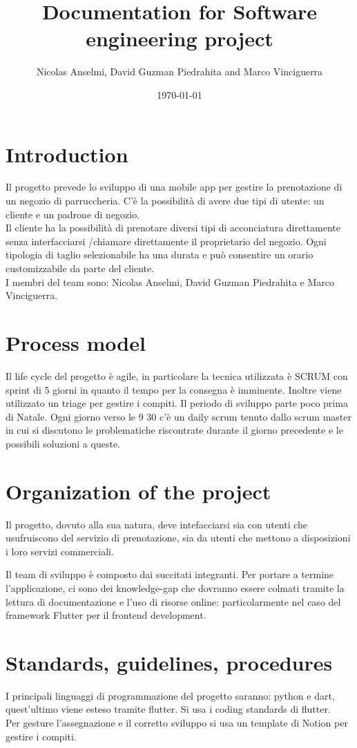 \documentclass{article}
\title{Documentation for Software engineering project}
\author{Nicolas Anselmi, David Guzman Piedrahita and Marco Vinciguerra}
\date{\today}
\begin{document}
\maketitle

\section{Introduction}
Il progetto prevede lo sviluppo di una mobile app per gestire la prenotazione di 
un negozio di parruccheria. C'è la possibilità di avere due tipi di utente:
un cliente e un padrone di negozio.\\
Il cliente ha la possibilità di prenotare diversi 
tipi di acconciatura direttamente senza interfacciarsi /chiamare direttamente il proprietario
del negozio. Ogni tipologia di taglio selezionabile ha una durata e può consentire un orario customizzabile 
da parte del cliente. \\
I membri del team sono: Nicolas Anselmi, David Guzman Piedrahita e Marco Vinciguerra.

\section{Process model}
Il life cycle del progetto è agile, in particolare la tecnica utilizzata è SCRUM con
sprint di 5 giorni in quanto il tempo per la consegna è imminente. Inoltre viene utilizzato un triage per
gestire i compiti.
Il periodo di sviluppo parte poco prima di Natale. Ogni giorno verso le 9 30 
c'è un daily scrum tenuto dallo scrum master in cui si discutono le problematiche riscontrate durante 
il giorno precedente e le possibili soluzioni a queste.

\section{Organization of the project}
Il progetto, dovuto alla sua natura, deve intefacciarsi sia con utenti  che usufruiscono del servizio di prenotazione, sia da utenti che mettono a disposizioni i loro servizi commerciali.

Il team di sviluppo è composto dai succitati integranti. Per portare a termine l'applicazione, ci sono dei knowledge-gap che dovranno essere colmati tramite la lettura di documentazione e l'uso di risorse online: particolarmente nel caso del framework Flutter per il frontend development.


\section{Standards, guidelines, procedures}
I principali linguaggi di programmazione del progetto saranno: python e dart, quest'ultimo
viene esteso tramite flutter.
Si usa i coding standards di flutter.
\\Per gesture l'assegnazione e il corretto sviluppo si usa un template di Notion per gestire i compiti.
\end{document}
